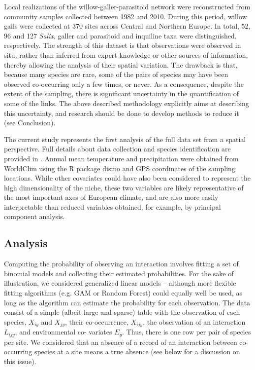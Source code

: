 \documentclass[12pt]{article}
\begin{document}
Local realizations of the willow-galler-parasitoid network were reconstructed
from community samples collected between 1982 and 2010. During this period,
willow galls were collected at 370 sites across Central and Northern Europe.
In total, 52, 96 and 127 \textit{Salix}, galler and parasitoid and inquiline
taxa were distinguished, respectively. The strength of this dataset is that
observations were observed in situ, rather than inferred from expert knowledge
or other sources of information, thereby allowing the analysis of their
spatial variation. The drawback is that, because many species are rare, some
of the pairs of species may have been observed co-occurring only a few times,
or never. As a consequence, despite the extent of the sampling, there is significant uncertainty in the quantification of some of the links. The above described methodology explicitly aims at describing this uncertainty, and research should be done to develop methods to reduce it (see Conclusion). 

The current study represents the first analysis of the full data set
from a spatial perspective. Full details about data collection and species
identification are provided in \citep{Kopelke2017}. Annual mean temperature
and precipitation were obtained from WorldClim using the R package dismo
\citep{Hijmans2015} and GPS coordinates of the sampling locations. While other
covariates could have also been considered to represent the high
dimensionality of the niche, these two variables are likely representative of
the most important axes of European climate, and are also more easily
interpretable than reduced variables obtained, for example, by principal
component analysis.

\subsection*{Analysis}

Computing the probability of observing an interaction involves fitting a set
of binomial models and collecting their estimated probabilities. For the sake
of illustration, we considered generalized linear models – although more
flexible fitting algorithms (e.g. GAM or Random Forest) could equally well be
used, as long as the algorithm can estimate the probability for each
observation. The data consist of a simple (albeit large and sparse) table with
the observation of each species, $X_{iy}$ and $X_{jy}$, their co-occurrence,
$X_{ijy}$, the observation of an interaction $L_{ijy}$, and environmental co-
variates $E_y$. Thus, there is one row per pair of species per site. We
considered that an absence of a record of an interaction between co-occurring
species at a site means a true absence (see below for a discussion on this
issue).
\end{document}
